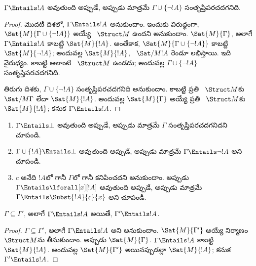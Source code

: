 \documentclass[../../../include/open-logic-section]{subfiles}
\begin{document}
\begin{prop}
$\Gamma \Entails !A$ అవుతుంది అప్పుడే, అప్పుడు మాత్రమే
$\Gamma \cup \{\lnot !A\}$ సంతృప్తిపరచదగనిది.
\end{prop}

\begin{proof}
మొదటి దిశలో, $\Gamma \Entails !A$ అనుకుందాం. ఇందుకు విరుద్ధంగా,
$\Sat{M}{\Gamma \cup \{ \lnot !A \}}$ అయ్యే
~$\Struct M$ ఉందని అనుకుందాం. $\Sat{M}{\Gamma}$, అలాగే
$\Gamma \Entails !A$ కాబట్టి $\Sat{M}{!A}$. అంతేకాక,
$\Sat{M}{\Gamma\cup \{ \lnot !A \}}$ కాబట్టి
$\Sat{M}{\lnot !A}$; అందువల్ల $\Sat{M}{!A}$, ~$\Sat/{M}{!A}$ రెండూ
లభిస్తాయి. ఇది వైరుధ్యం. కాబట్టి అలాంటి ~$\Struct M$
ఉండదు; అందువల్ల $\Gamma \cup \{ \lnot !A \}$
సంతృప్తిపరచదగనిది.

తిరుగు దిశకు, $\Gamma \cup \{ \lnot !A \}$
సంతృప్తిపరచదగనిది అనుకుందాం. కాబట్టి ప్రతి
~$\Struct M$కు $\Sat/{M}{\Gamma}$ లేదా $\Sat{M}{!A}$.
అందువల్ల $\Sat{M}{\Gamma}$ అయ్యే ప్రతి ~$\Struct M$కు
$\Sat{M}{!A}$; కనుక $\Gamma \Entails !A$.
\end{proof}

\begin{prob}
\begin{enumerate}
\item $\Gamma \Entails \bot$ అవుతుంది అప్పుడే, అప్పుడు మాత్రమే
  $\Gamma$ సంతృప్తిపరచదగనిదని చూపండి.
\item $\Gamma \cup \{!A\} \Entails \bot$ అవుతుంది అప్పుడే, అప్పుడు
  మాత్రమే $\Gamma \Entails \lnot !A$ అని చూపండి.
\item $c$ అనేది $!A$లో గానీ $\Gamma$లో గానీ కనిపించదని అనుకుందాం.
  అప్పుడు $\Gamma \Entails \lforall[x][!A]$ అవుతుంది అప్పుడే, అప్పుడు
  మాత్రమే $\Gamma \Entails \Subst{!A}{c}{x}$ అని చూపండి.
\end{enumerate}
\end{prob}

\begin{prop}
$\Gamma \subseteq \Gamma'$, అలాగే $\Gamma \Entails !A$ అయితే,
$\Gamma' \Entails !A$.
\end{prop}

\begin{proof}
$\Gamma \subseteq \Gamma'$, అలాగే $\Gamma \Entails !A$ అని
అనుకుందాం. $\Sat{M}{\Gamma'}$ అయ్యే నిర్మాణం~$\Struct M$ను
తీసుకుందాం. అప్పుడు $\Sat{M}{\Gamma}$. $\Gamma \Entails !A$ కాబట్టి
$\Sat{M}{!A}$. అందువల్ల $\Sat{M}{\Gamma'}$ అయినప్పుడల్లా
$\Sat{M}{!A}$; కనుక $\Gamma' \Entails !A$.
\end{proof}
\end{document}
